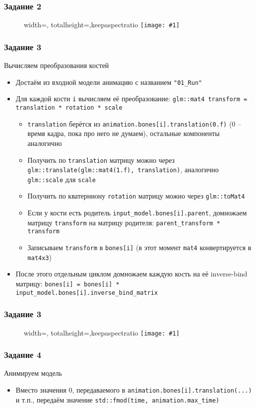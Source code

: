 \documentclass{beamer}
\newcommand{\slideimage}[1]{
  \begin{figure}
    \begin{adjustbox}{width=\textwidth, totalheight=\textheight-2\baselineskip-2\baselineskip,keepaspectratio}
      \texttt{[image: \#1]}
    \end{adjustbox}
  \end{figure}
}
\begin{document}
\begin{frame}[fragile]
\frametitle{Задание 2}
\slideimage{2.png}
\end{frame}

\begin{frame}[fragile]
\frametitle{Задание 3}
\fontsize{8pt}{8pt}
\selectfont
Вычисляем преобразования костей
\begin{itemize}
\item Достаём из входной модели анимацию с названием \verb|"01_Run"|
\item Для каждой кости \verb|i| вычисляем её преобразование: \verb|glm::mat4 transform = translation * rotation * scale|
\begin{itemize}
\fontsize{8pt}{8pt}
\selectfont
\item \verb|translation| берётся из \verb|animation.bones[i].translation(0.f)| (0 -- время кадра, пока про него не думаем), остальные компоненты аналогично
\item Получить по \verb|translation| матрицу можно через \verb|glm::translate(glm::mat4(1.f), translation)|, аналогично \verb|glm::scale| для \verb|scale|
\item Получить по кватерниону \verb|rotation| матрицу можно через \verb|glm::toMat4|
\item Если у кости есть родитель \verb|input_model.bones[i].parent|, домножаем матрицу \verb|transform| на матрицу родителя: \verb|parent_transform * transform|
\item Записываем \verb|transform| в \verb|bones[i]| (в этот момент \verb|mat4| конвертируется в \verb|mat4x3|)
\end{itemize}
\item После этого отдельным циклом домножаем каждую кость на её inverse-bind матрицу: \verb|bones[i] = bones[i] * input_model.bones[i].inverse_bind_matrix|
\end{itemize}
\end{frame}

\begin{frame}[fragile]
\frametitle{Задание 3}
\slideimage{3.png}
\end{frame}

\begin{frame}[fragile]
\frametitle{Задание 4}
Анимируем модель
\begin{itemize}
\item Вместо значения 0, передаваемого в \verb|animation.bones[i].translation(...)| и т.п., передаём значение \verb|std::fmod(time, animation.max_time)|
\end{itemize}
\end{frame}
\end{document}

